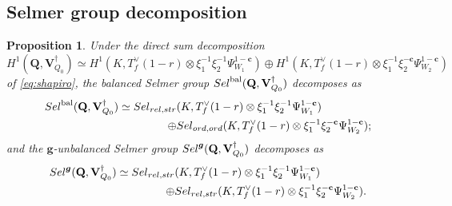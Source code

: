 \documentclass[10pt,letterpaper]{amsart}
\theoremstyle{plain}
\theoremstyle{definition}
\theoremstyle{definition}
\theoremstyle{plain}
\newtheorem{prop}[thm]{Proposition}
\theoremstyle{plain}
\theoremstyle{plain}
\theoremstyle{remark}
\numberwithin{equation}{section}
\newcommand{\cc}{\mathbf{c}}
\newcommand{\ch}{\xi}
\newcommand{\Sel}{Sel}
\newcommand{\rH}{H}
\newcommand{\relstr}{{{\rm rel},{\rm str}}}
\newcommand{\ord}{{{\rm ord},{\rm ord}}}
\DeclareMathOperator{\bal}{\mathrm{bal}}
\newcommand{\Vsdag}{{\mathbf{V}_{Q_0}^\dagger}}
\newcommand{\Q}{\mathbf{Q}}
\def\Sel{{\rm Sel}}
\newcommand{\bff}{{\boldsymbol{f}}}
\newcommand{\bfg}{{\boldsymbol{g}}}
\begin{document}
\subsection{Selmer group decomposition}
\label{subsec:Selmer-decomposition-indef}




\begin{prop}\label{prop:factor-S-indef}
Under the direct sum decomposition
\[
\rH^1(\Q,\Vsdag)\simeq\rH^1(K,T_f^{\vee}(1-r)\otimes\ch_1^{-1}\ch_2^{-1}\Psi_{W_1}^{1-\cc})\oplus\rH^1(K,T_f^{\vee}(1-r)\otimes\ch_1^{-1}\ch_2^{-\cc}\Psi_{W_2}^{1-\cc})
\]
of \eqref{eq:shapiro}, 
the balanced Selmer group $\Sel^{\bal}(\Q,\Vsdag)$ decomposes as
\begin{align*}
\Sel^{\bal}(\Q,\Vsdag)\simeq\Sel_{\relstr}&(K,T_f^{\vee}(1-r)\otimes\ch_1^{-1}\ch_2^{-1}\Psi_{W_1}^{1-\cc})\\ \oplus&\Sel_{\ord}(K,T_f^{\vee}(1-r)\otimes\ch_1^{-1}\ch_2^{-\cc}\Psi_{W_2}^{1-\cc});
\end{align*}
and the $\bfg$-unbalanced Selmer group $\Sel^{\bfg}(\Q,\Vsdag)$ decomposes as
\begin{align*}
\Sel^{\bfg}(\Q,\Vsdag)\simeq
\Sel_{\relstr}&(K,T_f^{\vee}(1-r)\otimes\ch_1^{-1}\ch_2^{-1}\Psi_{W_1}^{1-\cc})\\ \oplus&\Sel_{\relstr}(K,T_f^{\vee}(1-r)\otimes\ch_1^{-1}\ch_2^{-\cc}\Psi_{W_2}^{1-\cc}).\end{align*}
\end{prop}
\end{document}
